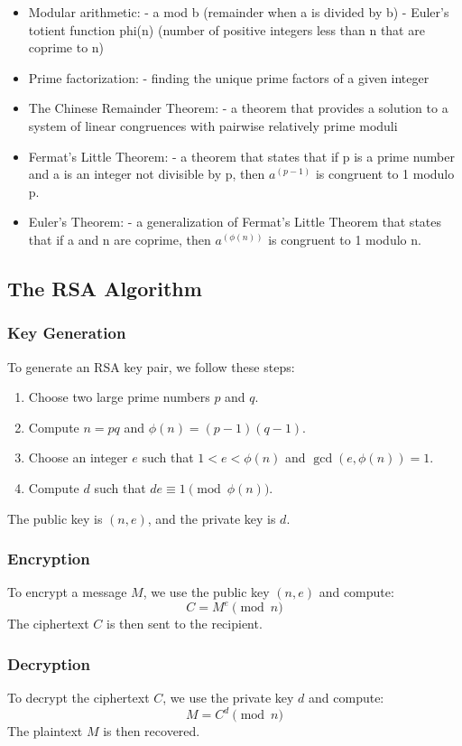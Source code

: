 \documentclass[12pt,openany]{book}
\theoremstyle{definition}
\begin{document}
	
	\begin{itemize}
		\item Modular arithmetic:
		- a mod b (remainder when a is divided by b)
		- Euler's totient function phi(n) (number of positive integers less than n that are coprime to n)
		\item Prime factorization:
		- finding the unique prime factors of a given integer
		\item The Chinese Remainder Theorem:
		- a theorem that provides a solution to a system of linear congruences with pairwise relatively prime moduli
		\item Fermat's Little Theorem:
		- a theorem that states that if p is a prime number and a is an integer not divisible by p, then $a^{(p-1)}$ is congruent to 1 modulo p.
		\item Euler's Theorem:
		- a generalization of Fermat's Little Theorem that states that if a and n are coprime, then $a^{(\phi(n))}$ is congruent to 1 modulo n.
	\end{itemize}
	
	\subsection{The RSA Algorithm}
	
	\subsubsection{Key Generation}
	To generate an RSA key pair, we follow these steps:
	\begin{enumerate}
		\item Choose two large prime numbers $p$ and $q$.
		\item Compute $n = pq$ and $\phi(n) = (p-1)(q-1)$.
		\item Choose an integer $e$ such that $1 < e < \phi(n)$ and $\gcd(e, \phi(n)) = 1$.
		\item Compute $d$ such that $de \equiv 1 \pmod{\phi(n)}$.
	\end{enumerate}
	The public key is $(n, e)$, and the private key is $d$.
	
	\subsubsection{Encryption}
	To encrypt a message $M$, we use the public key $(n, e)$ and compute:
	$$C = M^e \pmod{n}$$
	The ciphertext $C$ is then sent to the recipient.
	
	\subsubsection{Decryption}
	To decrypt the ciphertext $C$, we use the private key $d$ and compute:
	$$M = C^d \pmod{n}$$
	The plaintext $M$ is then recovered.
	
\end{document}
